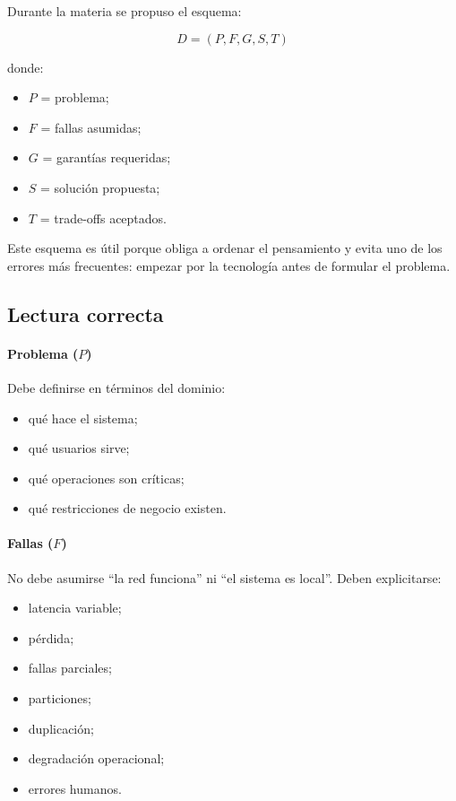 \documentclass[variant=apuntes,cover=institutional,mode=screen]{ua-engineering-v6-article}
\begin{document}
Durante la materia se propuso el esquema:

\[
D = (P, F, G, S, T)
\]

donde:
\begin{itemize}
\item $P$ = problema;
\item $F$ = fallas asumidas;
\item $G$ = garantías requeridas;
\item $S$ = solución propuesta;
\item $T$ = trade-offs aceptados.
\end{itemize}

Este esquema es útil porque obliga a ordenar el pensamiento y evita uno de los errores más frecuentes: empezar por la tecnología antes de formular el problema.

\subsection{Lectura correcta}

\paragraph{Problema ($P$)}
Debe definirse en términos del dominio:
\begin{itemize}
\item qué hace el sistema;
\item qué usuarios sirve;
\item qué operaciones son críticas;
\item qué restricciones de negocio existen.
\end{itemize}

\paragraph{Fallas ($F$)}
No debe asumirse “la red funciona” ni “el sistema es local”. Deben explicitarse:
\begin{itemize}
\item latencia variable;
\item pérdida;
\item fallas parciales;
\item particiones;
\item duplicación;
\item degradación operacional;
\item errores humanos.
\end{itemize}
\end{document}

